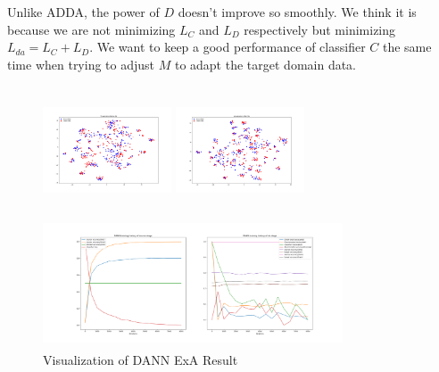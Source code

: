 \documentclass[conference]{IEEEtran}
\begin{document}
Unlike ADDA, the power of $D$ doesn't improve so smoothly. We think it is because we are not minimizing $L_C$ and $L_D$ respectively but minimizing $L_{da} = L_C+L_D$. We want to keep a good performance of classifier $C$ the same time when trying to adjust $M$ to adapt the target domain data.

\begin{figure}[htb]
\centering
\begin{minipage}[t]{0.2\textwidth}
\includegraphics[width=1.5in, height=1.5in]{Ldann/std_A2R/before.png}
\end{minipage}%
\begin{minipage}[t]{0.2\textwidth}
\includegraphics[width=1.5in, height=1.5in]{Ldann/std_A2R/after.png}
\end{minipage}%
\begin{minipage}[t]{0.45\textwidth}
\includegraphics[width=3.5in, height=1.5in]{Ldann/std_A2R/dann.png}
\end{minipage}%
\caption{Visualization of DANN ExA Result}\label{fig:ExA2}
\end{figure}
\end{document}
